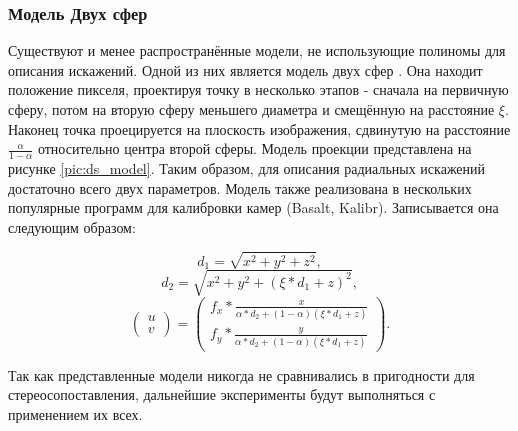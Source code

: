 \subsubsection{Модель Двух сфер}  %

Существуют и менее распространённые модели, не использующие полиномы для описания искажений. Одной из них является
модель двух сфер \cite{double_sphere}. 
Она находит положение пикселя, проектируя точку в несколько этапов - сначала на первичную сферу, потом на вторую 
сферу меньшего диаметра и смещённую на расстояние $\xi$. Наконец точка проецируется на  плоскость изображения,
 сдвинутую на расстояние $\frac{\alpha}{1-\alpha}$ относительно центра второй сферы. Модель проекции представлена 
на рисунке \ref{pic:ds_model}. Таким образом, для описания радиальных искажений достаточно всего двух параметров.
 Модель также реализована в нескольких популярные программ для калибровки камер (Basalt, Kalibr). 
 Записывается она следующим образом:
\begin{eqseries}
    \begin{equation}	
        d_1 = \sqrt{x^2+y^2+z^2}, 
    \end{equation}
    \begin{equation}	
        d_2 = \sqrt{x^2+y^2+(\xi*d_1+z)^2 }, 
    \end{equation}
    \begin{equation}	
        \begin{pmatrix}u\\v\end{pmatrix} = \begin{pmatrix}f_x * \frac{x}{\alpha*d_2+(1-\alpha)(\xi*d_1+z)} \\
                                                    f_y * \frac{y}{\alpha*d_2+(1-\alpha)(\xi*d_1+z)} \end{pmatrix}.
        \label{eqn:ds}
    \end{equation}
\end{eqseries}

Так как представленные модели никогда не сравнивались в пригодности для стереосопоставления, дальнейшие
эксперименты будут выполняться с применением их всех.

\vspace{\baselineskip}